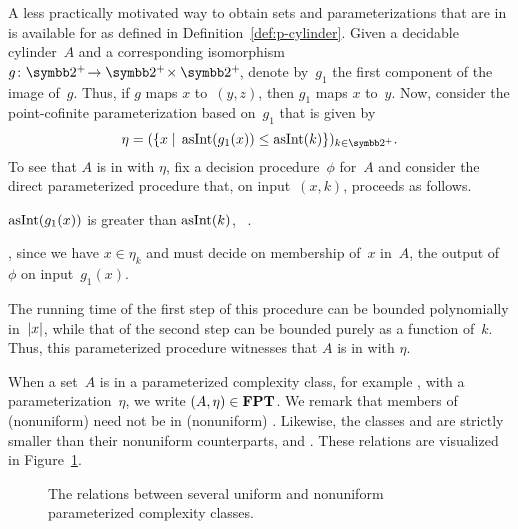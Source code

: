 \begin{example}
\label{ex:p-cylinder}%
  A less practically motivated way to obtain sets and parameterizations that are in  is available for  as defined in Definition~\ref{def:p-cylinder}.
  Given a decidable \pdash{}cylinder~$A$ and a corresponding isomorphism~$g\colon \binary^+\! \to \binary^+\! \times \binary^+\!$, denote by~$g_1$ the first component of the image of~$g$.
  Thus, if $g$ maps $x$ to~$(y, z)$, then $g_1$ maps $x$ to~$y$.
  Now, consider the point-cofinite parameterization based on~$g_1$ that is given by
  \begin{equation*}
    \eta \deq (\{x \st \asNat(g_1(x)) \le \asNat(k)\})_{k \in \binary^+}.
  \end{equation*}
  To see that $A$ is in  with $\eta$, fix a decision procedure~$\phi$ for~$A$ and consider the direct parameterized procedure that, on input~$(x, k)$, proceeds as follows.
  \begin{codelisting}
  \item
     $\asNat(g_1(x))$ is greater than $\asNat(k)$, ~.
  \item
    , since we have $x \in \eta_k$ and must decide on membership of~$x$ in~$A$,
    \itemcont {} the output of~$\phi$ on input~$g_1(x)$.
  \end{codelisting}
  The running time of the first step of this procedure can be bounded polynomially in~${\lvert x\rvert}$, while that of the second step can be bounded purely as a function of~$k$.
  Thus, this parameterized procedure witnesses that $A$ is in  with $\eta$.
\end{example}

When a set~$A$ is in a parameterized complexity class, for example , with a parameterization~$\eta$, we write $(A, \eta) \in \textnormal{\textbf{FPT}}$.
We remark that members of (nonuniform)  need not be in (nonuniform)  \parencite{downey1999parameterized,flum2006parameterized}.
Likewise, the classes  and  are strictly smaller than their nonuniform counterparts,  and  \parencite{downey1993fixed}.
These relations are visualized in Figure~\ref{fig:parameterized_classes}.
\begin{figure}[htbp]
  \centering
  \caption{
    The relations between several uniform and nonuniform parameterized complexity classes.
  }
  \label{fig:parameterized_classes}
\end{figure}
\FloatBarrier%

